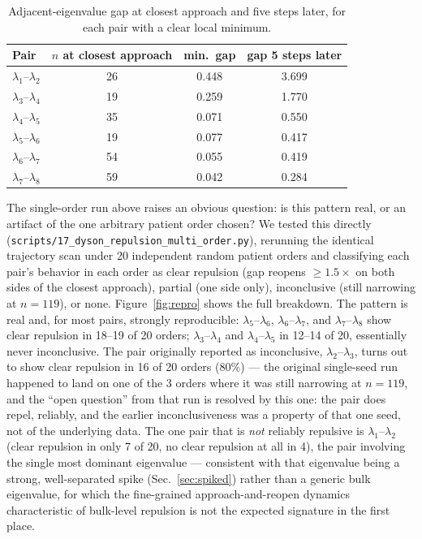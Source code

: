 \documentclass[11pt]{article}
\begin{document}
\begin{table}[h]
\centering
\caption{Adjacent-eigenvalue gap at closest approach and five steps
later, for each pair with a clear local minimum.}
\label{tab:repulsion}
\begin{tabular}{lccc}
\toprule
Pair & $n$ at closest approach & min.\ gap & gap 5 steps later \\
\midrule
$\lambda_1$--$\lambda_2$ & 26 & 0.448 & 3.699 \\
$\lambda_3$--$\lambda_4$ & 19 & 0.259 & 1.770 \\
$\lambda_4$--$\lambda_5$ & 35 & 0.071 & 0.550 \\
$\lambda_5$--$\lambda_6$ & 19 & 0.077 & 0.417 \\
$\lambda_6$--$\lambda_7$ & 54 & 0.055 & 0.419 \\
$\lambda_7$--$\lambda_8$ & 59 & 0.042 & 0.284 \\
\bottomrule
\end{tabular}
\end{table}

The single-order run above raises an obvious question: is this pattern
real, or an artifact of the one arbitrary patient order chosen? We
tested this directly (\texttt{scripts/17\_dyson\_repulsion\_multi\_order.py}),
rerunning the identical trajectory scan under 20 independent random
patient orders and classifying each pair's behavior in each order as
clear repulsion (gap reopens $\ge\!1.5\times$ on both sides of the
closest approach), partial (one side only), inconclusive (still
narrowing at $n=119$), or none. Figure~\ref{fig:repro} shows the full
breakdown. The pattern is real and, for most pairs, strongly
reproducible: $\lambda_5$--$\lambda_6$, $\lambda_6$--$\lambda_7$, and
$\lambda_7$--$\lambda_8$ show clear repulsion in 18--19 of 20 orders;
$\lambda_3$--$\lambda_4$ and $\lambda_4$--$\lambda_5$ in 12--14 of 20,
essentially never inconclusive. The pair originally reported as
inconclusive, $\lambda_2$--$\lambda_3$, turns out to show clear
repulsion in 16 of 20 orders (80\%) --- the original single-seed run
happened to land on one of the 3 orders where it was still narrowing
at $n=119$, and the ``open question'' from that run is resolved by
this one: the pair does repel, reliably, and the earlier
inconclusiveness was a property of that one seed, not of the
underlying data. The one pair that is \emph{not} reliably repulsive is
$\lambda_1$--$\lambda_2$ (clear repulsion in only 7 of 20, no clear
repulsion at all in 4), the pair involving the single most dominant
eigenvalue --- consistent with that eigenvalue being a strong,
well-separated spike (Sec.~\ref{sec:spiked}) rather than a generic bulk
eigenvalue, for which the fine-grained approach-and-reopen dynamics
characteristic of bulk-level repulsion is not the expected signature in
the first place.
\end{document}
